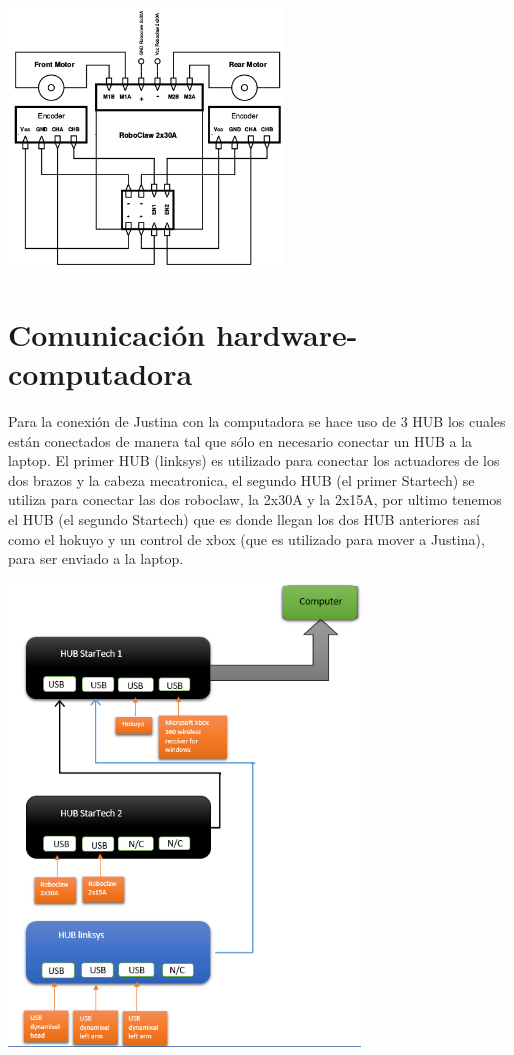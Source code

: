 \documentclass[user_manual.tex]{subfiles}
\begin{document}
\begin{center}
\includegraphics[width=0.55\textwidth]{Figures/Hardware/Esquematicos/Roboclaw_2.png}
\label{fig:Hardware:Partes:Diagrama:Esquematico:Roboclaw:2}
\end{center}

\section{Comunicación hardware-computadora}
Para la conexión de Justina con la computadora se hace uso de 3 HUB los cuales están conectados de manera tal que sólo en necesario conectar
un HUB a la laptop. El primer HUB (linksys) es utilizado para conectar los actuadores de los dos brazos y la cabeza mecatronica,
el segundo HUB (el primer Startech) se utiliza para conectar las dos roboclaw, la 2x30A y la 2x15A, por ultimo tenemos el HUB (el segundo 
Startech) que es donde llegan los dos HUB anteriores así como el hokuyo y un control de xbox (que es utilizado para mover a Justina), para
ser enviado a la laptop.
\begin{center}
\includegraphics[width=0.7\textwidth]{Figures/Hardware/Diagramas/HUB.png}
\label{fig:Hardware:Diagramas:Justina:HUBs}
\end{center}
\end{document}
